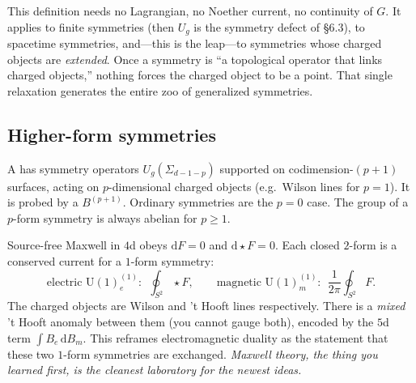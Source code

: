 \documentclass[11pt]{article}
\newcommand{\dd}{\mathrm{d}}                 %
\newcommand{\Uone}{\mathrm{U}(1)}
\begin{document}
\begin{iintuition}
This definition needs no Lagrangian, no Noether current, no continuity of $G$. It
applies to finite symmetries (then $U_g$ is the symmetry defect of \S6.3), to spacetime
symmetries, and---this is the leap---to symmetries whose charged objects are
\emph{extended}. Once a symmetry is ``a topological operator that links charged
objects,'' nothing forces the charged object to be a point. That single relaxation
generates the entire zoo of generalized symmetries.
\end{iintuition}

\subsection{Higher-form symmetries}

\begin{ddefinition}
A  has symmetry operators $U_g(\Sigma_{d-1-p})$
supported on codimension-$(p{+}1)$ surfaces, acting on $p$-dimensional charged objects
(e.g.\ Wilson lines for $p=1$). It is probed by a  $B^{(p+1)}$. Ordinary symmetries are the $p=0$ case. The group of a $p$-form
symmetry is always abelian for $p\geq1$.
\end{ddefinition}

\begin{eexample}
Source-free Maxwell in $4$d obeys $\dd F=0$ and $\dd\star F=0$. Each closed $2$-form is a
conserved current for a $1$-form symmetry:
\[
\text{electric } \Uone^{(1)}_e:\ \ \textstyle\oint_{S^2}\!\star F, \qquad
\text{magnetic } \Uone^{(1)}_m:\ \ \frac{1}{2\pi}\oint_{S^2}\!F.
\]
The charged objects are Wilson and 't Hooft lines respectively. There is a \emph{mixed}
't Hooft anomaly between them (you cannot gauge both), encoded by the $5$d term
$\int B_e\,\dd B_m$. This reframes electromagnetic duality as the statement that these
two $1$-form symmetries are exchanged. \emph{Maxwell theory, the thing you learned
first, is the cleanest laboratory for the newest ideas.}
\end{eexample}
\end{document}
